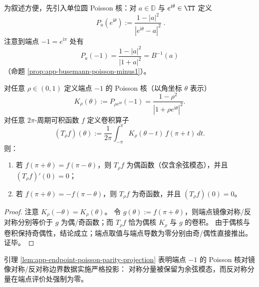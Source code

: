 \medskip
为叙述方便，先引入单位圆 Poisson 核：对 \(a\in\mathbb{D}\) 与 \(e^{\mathrm{i}\theta}\in\TT\) 定义
\begin{equation}\label{eq:app-poisson-kernel}
\boxed{\;
P_a(e^{\mathrm{i}\theta})
:=\frac{1-|a|^2}{|e^{\mathrm{i}\theta}-a|^2}\; }.
\end{equation}
注意到端点 \(-1=e^{\mathrm{i}\pi}\) 处有
\begin{equation}\label{eq:app-poisson-kernel-endpoint-minus1}
\boxed{\;
P_a(-1)=\frac{1-|a|^2}{|1+a|^2}=B^{-1}(a)\;}
\end{equation}
（命题 \ref{prop:app-busemann-poisson-minus1}）。

\begin{lemma}\label{lem:app-endpoint-poisson-parity-projection}
对任意 \(\rho\in(0,1)\) 定义端点 \(-1\) 的 Poisson 核（以角坐标 \(\theta\) 表示）
\[
K_\rho(\theta):=P_{\rho e^{\mathrm{i}\theta}}(-1)=\frac{1-\rho^2}{|1+\rho e^{\mathrm{i}\theta}|^2}.
\]
对任意 \(2\pi\)-周期可积函数 \(f\) 定义卷积算子
\[
(T_\rho f)(\theta):=\frac{1}{2\pi}\int_{-\pi}^{\pi}K_\rho(\theta-t)\,f(\pi+t)\,dt.
\]
则：
\begin{enumerate}
  \item 若 \(f(\pi+\theta)=f(\pi-\theta)\)，则 \(T_\rho f\) 为偶函数（仅含余弦模态），并且 \((T_\rho f)'(0)=0\)；
  \item 若 \(f(\pi+\theta)=-f(\pi-\theta)\)，则 \(T_\rho f\) 为奇函数，并且 \((T_\rho f)(0)=0\)。
\end{enumerate}
\end{lemma}
\begin{proof}
注意 \(K_\rho(-\theta)=K_\rho(\theta)\)。
令 \(g(\theta):=f(\pi+\theta)\)，则端点镜像对称/反对称分别等价于 \(g\) 为偶/奇函数；而 \(T_\rho f\) 恰为偶核 \(K_\rho\) 与 \(g\) 的卷积。
由于偶核与卷积保持奇偶性，结论成立；端点取值与端点导数为零分别由奇/偶性直接推出。证毕。
\end{proof}

\begin{remark}[端点读出的投影性]\label{rem:app-endpoint-poisson-projection}
引理 \ref{lem:app-endpoint-poisson-parity-projection} 表明端点 \(-1\) 的 Poisson 核对镜像对称/反对称边界数据实施严格投影：
对称分量被保留为余弦模态，而反对称分量在端点评价处强制为零。
\end{remark}

